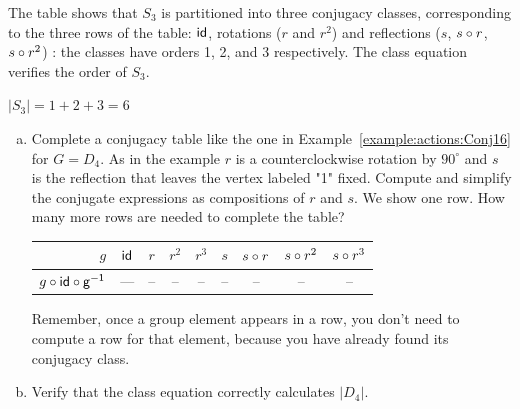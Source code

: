 \begin{example}

The table shows that $S_3$ is partitioned into  three conjugacy classes, corresponding to the three rows of the table: $\sf{id}$, rotations ($r$ and $r^2$) and reflections ($s$, $s \circ r$, $s \circ r^2$) : the classes have orders 1, 2, and 3 respectively.  The class equation verifies the order of $S_3$.

$|S_3|=1+2+3=6$
\end{example}

\begin{exercise}\label{exercise:actions:Conj17}
\begin{enumerate}[(a)]
\item Complete a conjugacy table like the one in  Example~\ref{example:actions:Conj16} for $G=D_4$. As in the example $r$ is a counterclockwise rotation by  $90^{\circ}$ and $s$ is the reflection that leaves the vertex labeled "1" fixed. Compute and simplify the conjugate expressions as compositions of $r$ and $s$. We show one row.  How many more rows are needed to complete the table?

\begin{center}

\begin{tabular}{ |r| c | c |c |c |c |c | c|c |} \hline
  $g$ &$\sf{id}$ & $r$ &$r^2$ &$r^3$ & $s$ &$s\circ r$ & $s\circ r ^2$ & $s\circ r^3$\\ \hline
  $g\circ \sf{id}\circ g^{-1}$ &--- & -- & -- &-- &--&--&--&-- \\
\end{tabular}
\end{center}

 Remember, once a group element appears in a row, you don't need to compute a row for that element, because you have already found its conjugacy class.
\item Verify that the class equation correctly calculates $|D_4|$.
\end{enumerate}
\end{exercise}

